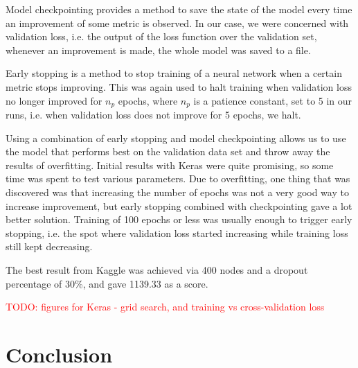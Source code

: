 \documentclass[a4paper]{article}
\newcommand\todo[1]{\textcolor{red}{TODO: #1}}
\begin{document}
Model checkpointing provides a method to save the state of the model every time an improvement of some metric is observed.  In our case, we were concerned with validation loss, i.e. the output of the loss function over the validation set, whenever an improvement is made, the whole model was saved to a file.  

Early stopping is a method to stop training of a neural network when a certain metric stops improving.  This was again used to halt training when validation loss no longer improved for $n_p$ epochs, where $n_p$ is a patience constant, set to 5 in our runs, i.e. when validation loss does not improve for 5 epochs, we halt.  

Using a combination of early stopping and model checkpointing allows us to use the model that performs best on the validation data set and throw away the results of overfitting.  Initial results with Keras were quite promising, so some time was spent to test various parameters.  Due to overfitting, one thing that was discovered was that increasing the number of epochs was not a very good way to increase improvement, but early stopping combined with checkpointing gave a lot better solution.  Training of 100 epochs or less was usually enough to trigger early stopping, i.e. the spot where validation loss started increasing while training loss still kept decreasing. 

The best result from Kaggle was achieved via 400 nodes and a dropout percentage of 30\%, and gave 1139.33 as a score.

\todo{figures for Keras - grid search, and training vs cross-validation loss}




\section{Conclusion}
\end{document}

